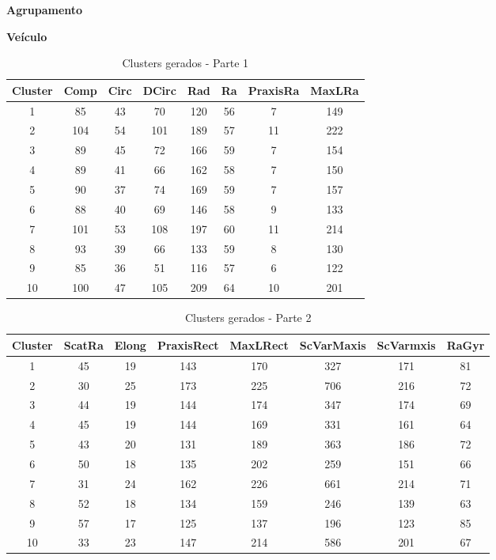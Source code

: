 \begin{adjustwidth}{1em}{}
\textbf{Agrupamento}
\end{adjustwidth}

\begin{center}
    \textbf{Veículo}
\end{center}

\begin{table}[H]
\centering
\caption{Clusters gerados - Parte 1}
\begin{tabular}{|c|c|c|c|c|c|c|c|}
\hline
Cluster & Comp & Circ & DCirc & Rad & Ra & PraxisRa & MaxLRa \\ \hline
1  & 85  & 43  & 70  & 120 & 56 & 7  & 149 \\ \hline
2  & 104 & 54  & 101 & 189 & 57 & 11 & 222 \\ \hline
3  & 89  & 45  & 72  & 166 & 59 & 7  & 154 \\ \hline
4  & 89  & 41  & 66  & 162 & 58 & 7  & 150 \\ \hline
5  & 90  & 37  & 74  & 169 & 59 & 7  & 157 \\ \hline
6  & 88  & 40  & 69  & 146 & 58 & 9  & 133 \\ \hline
7  & 101 & 53  & 108 & 197 & 60 & 11 & 214 \\ \hline
8  & 93  & 39  & 66  & 133 & 59 & 8  & 130 \\ \hline
9  & 85  & 36  & 51  & 116 & 57 & 6  & 122 \\ \hline
10 & 100 & 47  & 105 & 209 & 64 & 10 & 201 \\ \hline
\end{tabular}
\end{table}

\begin{table}[H]
\centering
\caption{Clusters gerados - Parte 2}
\begin{tabular}{|c|c|c|c|c|c|c|c|}
\hline
Cluster & ScatRa & Elong & PraxisRect & MaxLRect & ScVarMaxis & ScVarmxis & RaGyr \\ \hline
1  & 45 & 19 & 143 & 170 & 327 & 171 & 81 \\ \hline
2  & 30 & 25 & 173 & 225 & 706 & 216 & 72 \\ \hline
3  & 44 & 19 & 144 & 174 & 347 & 174 & 69 \\ \hline
4  & 45 & 19 & 144 & 169 & 331 & 161 & 64 \\ \hline
5  & 43 & 20 & 131 & 189 & 363 & 186 & 72 \\ \hline
6  & 50 & 18 & 135 & 202 & 259 & 151 & 66 \\ \hline
7  & 31 & 24 & 162 & 226 & 661 & 214 & 71 \\ \hline
8  & 52 & 18 & 134 & 159 & 246 & 139 & 63 \\ \hline
9  & 57 & 17 & 125 & 137 & 196 & 123 & 85 \\ \hline
10 & 33 & 23 & 147 & 214 & 586 & 201 & 67 \\ \hline
\end{tabular}
\end{table}

